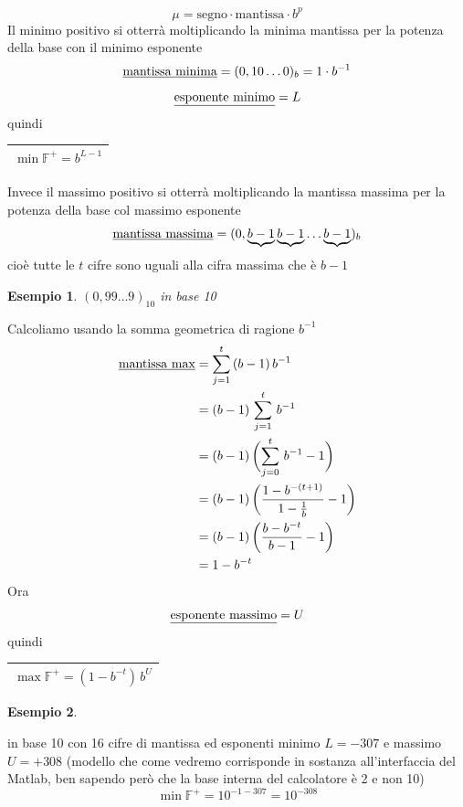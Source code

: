 \documentclass[12pt]{article}
\newtheorem*{esempio}{Esempio}
\begin{document}
\[\mu = \text{segno} \cdot \text{mantissa} \cdot b^p\]
Il minimo positivo si otterrà moltiplicando la minima mantissa per la potenza della base con il minimo esponente
\[ \text{\underline{mantissa minima}} = (0,10 \dotsc 0)_b = 1 \cdot b^{-1}\]
\[ \text{\underline{esponente minimo}} = L\]
quindi
\begin{table}[h!]
    \centering
    \begin{tabular}{|c|}
    \hline
        $\min \mathbb{F}^+ = b^{L-1}$ \\
    \hline
    \end{tabular}
\end{table}
Invece il massimo positivo si otterrà moltiplicando la mantissa massima per la potenza della base col massimo esponente
\[ \text{\underline{mantissa massima}} = (0,\underbrace{b-1} \underbrace{b-1} \dotsc \underbrace{b-1})_b\]
cioè tutte le $t$ cifre sono uguali alla cifra massima che è $b-1$
\begin{esempio}
$(0,99 \dotsc 9)_{10}$ in base 10
\end{esempio}
Calcoliamo usando la somma geometrica di ragione $b^{-1}$
\[\begin{split}
    \text{\underline{mantissa max}} & = \sum_{j=1}^t\,(b-1)\,b^{-1} \\
    & = (b-1)\,\sum_{j=1}^t\,b^{-1} \\
    & = (b-1)\,\biggl(\sum_{j=0}^t\,b^{-1} - 1\biggr) \\
    & = (b-1)\,\biggl(\frac{1 - b^{-(t+1)}}{1 - \frac{1}{b}} - 1\biggr) \\
    & = (b-1)\,\biggl(\frac{b - b^{-t}}{b - 1} - 1\biggr) \\
    & = 1 - b^{-t} \\
\end{split}\]
Ora \[ \text{\underline{esponente massimo}} = U\] quindi
\begin{table}[h!]
    \centering
    \begin{tabular}{|c|}
    \hline
        $\max \mathbb{F}^+ = (1 - b^{-t})\,b^U$ \\
    \hline
    \end{tabular}
\end{table}
\begin{esempio} \end{esempio}
in base 10 con 16 cifre di mantissa ed esponenti minimo $L = - 307$ e massimo $U = + 308$ (modello che come vedremo corrisponde in sostanza all'interfaccia del Matlab, ben sapendo però che la base interna del calcolatore è 2 e non 10)
\[ \min \mathbb{F}^+ = 10^{- 1 - 307} = 10^{- 308} \]
\end{document}
